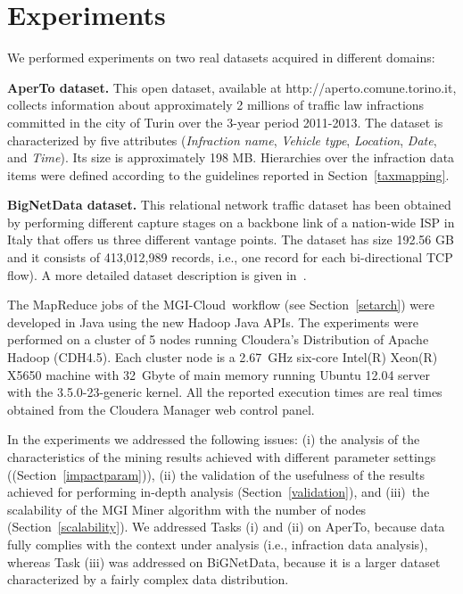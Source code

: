 \documentclass[10pt, conference, compsocconf]{IEEEtran}
\newcommand{\SeTAB}{{\sc MGI-Cloud}}
\begin{document}
\section{Experiments}
\label{exp}
We performed experiments on two real datasets acquired in different domains:

\noindent \textbf{AperTo dataset.}  This open dataset, available at http://aperto.comune.torino.it, collects information about approximately 2 millions of traffic law infractions committed in the city 
of Turin over the 3-year period 2011-2013. The dataset is characterized by five attributes (\textit{Infraction name}, \textit{Vehicle type}, \textit{Location}, \textit{Date}, and \textit{Time}). Its size is approximately 198 MB. 
Hierarchies over the infraction data items were defined according to the guidelines reported in Section~\ref{taxmapping}.

\noindent  \textbf{BigNetData dataset.} This relational network traffic dataset has been obtained by performing different
capture stages on a backbone link of a nation-wide ISP in Italy that offers us three different vantage points.
The dataset has size 192.56 GB and it consists of 413,012,989 records, i.e., one record for each bi-directional TCP flow).
A more detailed dataset description is given in~\cite{ISPA13}.

The MapReduce jobs of the \SeTAB\ workflow (see Section~\ref{setarch}) were
developed in Java using the new Hadoop Java APIs.
The experiments were performed on a cluster of 5 nodes running Cloudera's
Distribution of Apache Hadoop (CDH4.5). Each cluster node is a 2.67~GHz
six-core Intel(R) Xeon(R) X5650 machine with 32~Gbyte of main memory running
Ubuntu 12.04 server with the 3.5.0-23-generic kernel. All the reported
execution times are real times obtained from the Cloudera Manager web control panel.

In the experiments we addressed the following issues: 
(i) the analysis of the characteristics of the mining results achieved with different parameter settings ((Section~\ref{impactparam})), 
(ii) the validation of the usefulness of the results achieved for performing in-depth analysis (Section~\ref{validation}), 
and (iii)~the scalability of the MGI Miner algorithm with the number of nodes (Section~\ref{scalability}). 
We addressed Tasks (i) and (ii) on AperTo, because data fully complies with the context under analysis (i.e., infraction data analysis), whereas
Task (iii) was addressed on BiGNetData, because it is a larger dataset characterized by a fairly complex data distribution.
\end{document}
